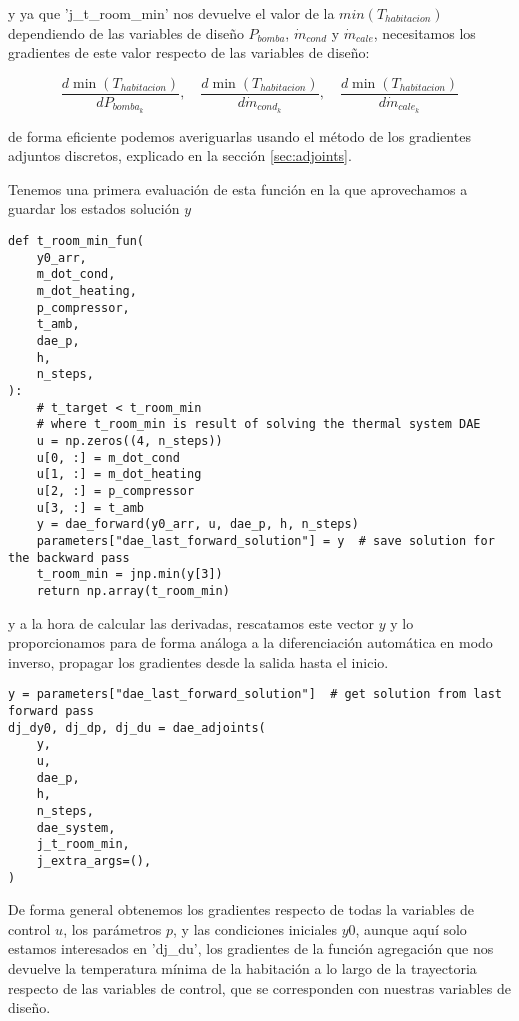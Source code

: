 y ya que 'j\_t\_room\_min' nos devuelve el valor de la $min(T_{habitacion})$
dependiendo de las variables de diseño $P_{bomba}$, $\dot{m}_{cond}$ y
$\dot{m}_{cale}$, necesitamos los gradientes de este valor respecto de las
variables de diseño:

\begin{equation*}
	\frac{d \min(T_{habitacion})}{d P_{bomba_k}}, \quad \frac{d \min(T_{habitacion})}{d \dot{m}_{cond_k}}, \quad \frac{d \min(T_{habitacion})}{d \dot{m}_{cale_k}}
\end{equation*}

de forma eficiente podemos averiguarlas usando el método de los gradientes
adjuntos discretos, explicado en la sección \ref{sec:adjoints}.

Tenemos una primera evaluación de esta función en la que aprovechamos a guardar
los estados solución $y$

\begin{verbatim}
def t_room_min_fun(
    y0_arr,
    m_dot_cond,
    m_dot_heating,
    p_compressor,
    t_amb,
    dae_p,
    h,
    n_steps,
):
    # t_target < t_room_min
    # where t_room_min is result of solving the thermal system DAE
    u = np.zeros((4, n_steps))
    u[0, :] = m_dot_cond
    u[1, :] = m_dot_heating
    u[2, :] = p_compressor
    u[3, :] = t_amb
    y = dae_forward(y0_arr, u, dae_p, h, n_steps)
    parameters["dae_last_forward_solution"] = y  # save solution for the backward pass
    t_room_min = jnp.min(y[3])
    return np.array(t_room_min)
\end{verbatim}

y a la hora de calcular las derivadas, rescatamos este vector $y$ y lo
proporcionamos para de forma análoga a la diferenciación automática en modo
inverso, propagar los gradientes desde la salida hasta el inicio.

\begin{verbatim}
y = parameters["dae_last_forward_solution"]  # get solution from last forward pass
dj_dy0, dj_dp, dj_du = dae_adjoints(
    y,
    u,
    dae_p,
    h,
    n_steps,
    dae_system,
    j_t_room_min,
    j_extra_args=(),
)
\end{verbatim}

De forma general obtenemos los gradientes respecto de todas la variables de
control $u$, los parámetros $p$, y las condiciones iniciales $y0$, aunque aquí
solo estamos interesados en 'dj\_du', los gradientes de la función agregación
que nos devuelve la temperatura mínima de la habitación a lo largo de la
trayectoria respecto de las variables de control, que se corresponden con
nuestras variables de diseño.


